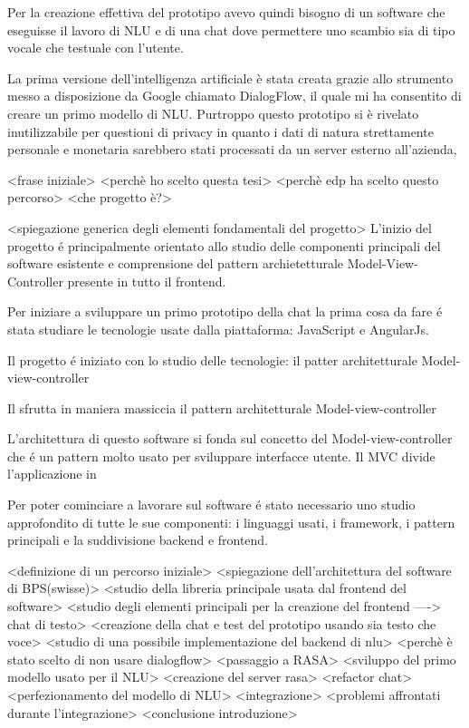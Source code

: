 Per la creazione effettiva del prototipo avevo quindi bisogno di un software che eseguisse il lavoro di NLU e di una chat dove permettere uno scambio sia di tipo vocale che testuale con l’utente.

La prima versione dell’intelligenza artificiale è stata creata grazie allo strumento messo a disposizione da Google chiamato DialogFlow, il quale mi ha consentito di creare un primo modello di NLU. Purtroppo questo prototipo si è rivelato inutilizzabile per questioni di privacy in quanto i dati di natura strettamente personale e monetaria sarebbero stati processati da un server esterno all’azienda, 





<frase iniziale> 
<perchè ho scelto questa tesi>
<perchè edp ha scelto questo percorso>
<che progetto è?>

<spiegazione generica degli elementi fondamentali del progetto>
L'inizio del progetto \'e principalmente orientato allo studio delle componenti principali del software esistente e comprensione del pattern archietetturale Model-View-Controller presente in tutto il frontend.

Per iniziare a sviluppare un primo prototipo della chat la prima cosa da fare \'e stata studiare le tecnologie usate dalla piattaforma: JavaScript e AngularJs.  

Il progetto \'e iniziato con lo studio delle tecnologie: il patter architetturale Model-view-controller

Il sfrutta in maniera massiccia il pattern architetturale Model-view-controller

L'architettura di questo software si fonda sul concetto del Model-view-controller che \'e un pattern molto usato per sviluppare interfacce utente. Il MVC divide l'applicazione in 

Per poter cominciare a lavorare sul software \'e stato necessario uno studio approfondito di tutte le sue componenti: i linguaggi usati, i framework, i pattern principali e la suddivisione backend e frontend.

<definizione di un percorso iniziale>
<spiegazione dell'architettura del software di BPS(swisse)>
<studio della libreria principale usata dal frontend del software>
<studio degli elementi principali per la creazione del frontend ----> chat di testo>
<creazione della chat e test del prototipo usando sia testo che voce>
<studio di una possibile implementazione del backend di nlu>
<perchè è stato scelto di non usare dialogflow>
<passaggio a RASA>
<sviluppo del primo modello usato per il NLU>
<creazione del server rasa>
<refactor chat>
<perfezionamento del modello di NLU>
<integrazione>
<problemi affrontati durante l'integrazione>
<conclusione introduzione>
